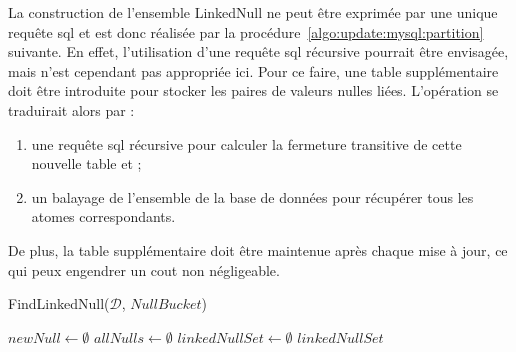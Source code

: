 \begin{remark}
    La construction de l'ensemble \textsf{LinkedNull} ne peut être exprimée par une unique requête \gls{sql} et est donc réalisée par la procédure~\ref{algo:update:mysql:partition} suivante.
    En effet, l'utilisation d'une requête \gls{sql} récursive pourrait être envisagée, mais n'est cependant pas appropriée ici.
    Pour ce faire, une table supplémentaire doit être introduite pour stocker les paires de valeurs nulles liées.
    L'opération se traduirait alors par :
    \begin{enumerate}
        \item une requête \gls{sql} récursive pour calculer la fermeture transitive de cette nouvelle table et ;
        \item un balayage de l'ensemble de la base de données pour récupérer tous les atomes correspondants.
    \end{enumerate}
    De plus, la table supplémentaire doit être maintenue après chaque mise à jour, ce qui peux engendrer un cout non négligeable.
\end{remark}

\begin{procedure}[htb]
	\caption{FindLinkedNull($\mathcal{D}$, $NullBucket$)}
    \label{algo:update:mysql:partition}

	$newNull \gets \emptyset$ \;
    $allNulls \gets \emptyset$ \;
    $linkedNullSet \gets \emptyset$ \;
	\Return $linkedNullSet$ \;
\end{procedure}

